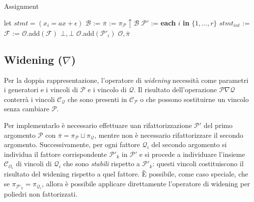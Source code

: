 \documentclass{mimosis}
\theoremstyle{definition}
\begin{document}
\begin{algorithm}[H]
\caption{Assignment}\label{assignment}
\begin{algorithmic}[1]
\State let $stmt = (x_{i} = ax + \epsilon) $
\State$\mathcal{B}$ := 
\State$\overline{\pi}$ := $\pi_{\mathcal{P}} \uparrow \mathcal{B}$
\State$\mathcal{P}'$ := 
\For\textbf{each} $i$ \textbf{in} $\{1,...,r\}$
\State$stmt_{int}$ := 
\State$\mathcal{F}$ := 
\State $\mathcal{O}$.add$(\mathcal{F})$
\State\Return$\bot,\bot$
\EndIf
\Else
\State $\mathcal{O}$.add$(\mathcal{P}'_i)$
\EndIf
\EndFor
\State\Return $\mathcal{O}, \overline{\pi}$
\EndFunction
\end{algorithmic}
\end{algorithm}

\subsection{Widening (\(\nabla\))}
\label{sec:org7748ae2}
Per la doppia rappresentazione, l'operatore di \emph{widening} necessità come
parametri i generatori e i vincoli di \(\mathcal{P}\) e i vincolo di
\(\mathcal{Q}\). Il risultato dell'operazione \(\mathcal{P} \nabla
\mathcal{Q}\) conterrà i vincoli \(\mathcal{C}_{\mathcal{Q}}\) che sono presenti in
\(\mathcal{C}_{\mathcal{P}}\) o che possono sostituirne un vincolo senza cambiare
\(\mathcal{P}\).

Per implementarlo è necessario effettuare uan rifattorizzazione \(\mathcal{P}'\)
del primo argomento \(\mathcal{P}\) con \(\overline{\pi} = \pi_{\mathcal{P}} \sqcup
\pi_{\mathcal{Q}}\), mentre non è necessario rifattorizzare il secondo argomento.
Successivamente, per ogni fattore \(\mathcal{Q}_i\) del secondo argomento si
individua il fattore corrispondente \(\mathcal{P}'_k\) in \(\mathcal{P}'\) e si
procede a individuare l'insieme \(\mathcal{C}_{\mathcal{O}_i}\) di vincoli di
\(\mathcal{Q}_i\) che sono \emph{stabili} rispetto a \(\mathcal{P}'_k\): questi vincoli
costituiscono il risultato del widening rispetto a quel fattore. È possibile,
come caso speciale, che se \(\pi_{\mathcal{P}'_k} = \pi_{\mathcal{Q}_i}\), allora è
possibile applicare direttamente l'operatore di widening per poliedri non fattorizzati.
\end{document}
